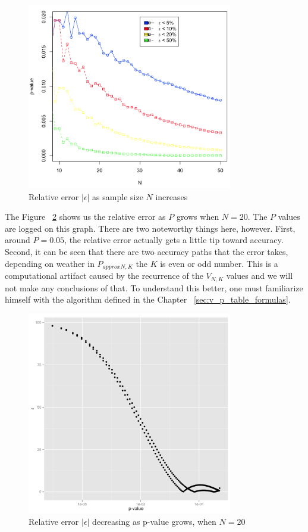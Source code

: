 \documentclass[12pt]{article}
\begin{document}
{\begin{figure}[H]
  \centering
  \includegraphics[width=0.8\textwidth]{PvsN}
  \caption{Relative error $|\epsilon|$ as sample size $N$ increases}
  \label{fig:PvsN}
\end{figure}

The Figure ~\ref{fig:RelativeErrorDecresingPgrows} shows us the relative error as $P$ grows when $N = 20$. The $P$ values are logged on this graph. There are two noteworthy things here, however. First, around $P = 0.05$, the relative error actually gets a little tip toward accuracy. Second, it can be seen that there are two accuracy paths that the error takes, depending on weather in $P_{approx N, K}$  the $K$ is even or odd number. This is a computational artifact caused by the recurrence of the $V_{N, K}$ values and we will not make any conclusions of that. To understand this better, one must familiarize himself with the algorithm defined in the Chapter ~\ref{sec:v_p_table_formulas}.


\begin{figure}[H]
	\centering
  \includegraphics[width=0.8\textwidth]{RelativeErrorDecreasingPgrowsN20}
	\caption{Relative error $|\epsilon|$ decreasing as p-value grows, when $N=20$}
	\label{fig:RelativeErrorDecresingPgrows}
\end{figure}

}
\end{document}
